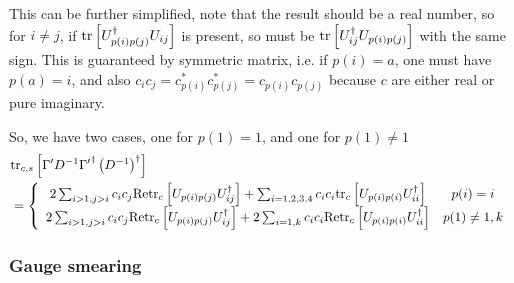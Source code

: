 This can be further simplified, note that the result should be a real number, so for $i\neq j$, if ${\rm tr}\left[U^{\dagger}_{p(i)p(j)}U_{ij}\right]$ is present, so must be ${\rm tr}\left[U^{\dagger}_{ij}U_{p(i)p(j)}\right]$ with the same sign. This is guaranteed by symmetric matrix, i.e. if $p(i)=a$, one must have $p(a)=i$, and also $c_ic_j=c^*_{p(i)}c^*_{p(j)}=c_{p(i)}c_{p(j)}$ because $c$ are either real or pure imaginary.

So, we have two cases, one for $p(1)=1$, and one for $p(1)\neq 1$
\begin{equation}
\begin{split}
&{\rm tr}_{c,s}\left[\Gamma ' D^{-1}{\Gamma '}^{\dagger}\left(D^{-1}\right)^{\dagger}\right]\\
& = \left\{\begin{array}{cc}
2\sum _{i>1,j>i}c_ic_j {\rm Retr}_c\left[U_{p(i)p(j)}U^{\dagger}_{ij}\right]+\sum _{i=1,2,3,4}c_ic_i {\rm tr}_c\left[U_{p(i)p(i)}U^{\dagger}_{ii}\right] & p(i)=i\\
2\sum _{i>1,j>i}c_ic_j {\rm Retr}_c\left[U_{p(i)p(j)}U^{\dagger}_{ij}\right]+2\sum _{i=1,k}c_ic_i {\rm Retr}_c\left[U_{p(i)p(i)}U^{\dagger}_{ii}\right] & p(1)\neq 1,k\\
\end{array}\right.
\end{split}
\end{equation}


\subsubsection{\label{Gauge_Smearing}Gauge smearing}

